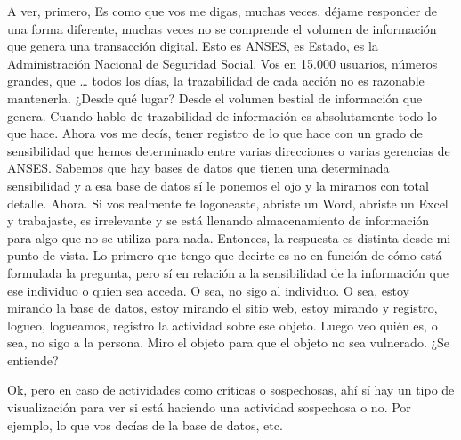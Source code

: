 \begin{description}[leftmargin=0cm, labelsep=0.5cm]
    \item[\textbf{PITA GUILLERMO:}] A ver, primero, Es como que vos me digas, muchas veces, déjame responder de una forma diferente, muchas veces no se comprende el volumen de información que genera una transacción digital. Esto es ANSES, es Estado, es la Administración Nacional de Seguridad Social. Vos en 15.000 usuarios, números grandes, que … todos los días, la trazabilidad de cada acción no es razonable mantenerla. ¿Desde qué lugar? Desde el volumen bestial de información que genera. Cuando hablo de trazabilidad de información es absolutamente todo lo que hace. Ahora vos me decís, tener registro de lo que hace con un grado de sensibilidad que hemos determinado entre varias direcciones o varias gerencias de ANSES. Sabemos que hay bases de datos que tienen una determinada sensibilidad y a esa base de datos sí le ponemos el ojo y la miramos con total detalle. Ahora. Si vos realmente te logoneaste, abriste un Word, abriste un Excel y trabajaste, es irrelevante y se está llenando almacenamiento de información para algo que no se utiliza para nada. Entonces, la respuesta es distinta desde mi punto de vista. Lo primero que tengo que decirte es no en función de cómo está formulada la pregunta, pero sí en relación a la sensibilidad de la información que ese individuo o quien sea acceda. O sea, no sigo al individuo. O sea, estoy mirando la base de datos, estoy mirando el sitio web, estoy mirando y registro, logueo, logueamos, registro la actividad sobre ese objeto. Luego veo quién es, o sea, no sigo a la persona. Miro el objeto para que el objeto no sea vulnerado. ¿Se entiende?

    \item[\textbf{MOCIULSKY SANTIAGO:}] Ok, pero en caso de actividades como críticas o sospechosas, ahí sí hay un tipo de visualización para ver si está haciendo una actividad sospechosa o no. Por ejemplo, lo que vos decías de la base de datos, etc.


\end{description}
